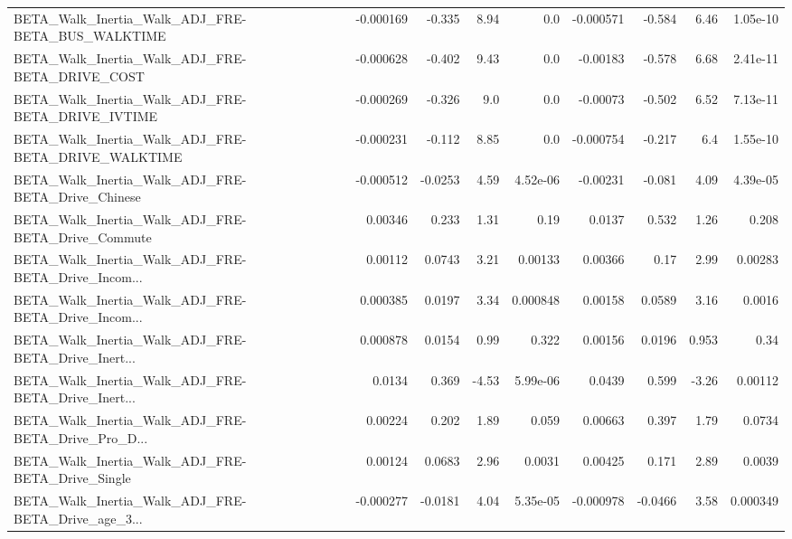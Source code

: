 \begin{tabular}{lrrrrrrrr}
BETA\_Walk\_Inertia\_Walk\_ADJ\_FRE-BETA\_BUS\_WALKTIME   &   -0.000169 &       -0.335 &     8.94 &      0.0 &  -0.000571 &      -0.584 &         6.46 &      1.05e-10 \\
BETA\_Walk\_Inertia\_Walk\_ADJ\_FRE-BETA\_DRIVE\_COST     &   -0.000628 &       -0.402 &     9.43 &      0.0 &   -0.00183 &      -0.578 &         6.68 &      2.41e-11 \\
BETA\_Walk\_Inertia\_Walk\_ADJ\_FRE-BETA\_DRIVE\_IVTIME   &   -0.000269 &       -0.326 &      9.0 &      0.0 &   -0.00073 &      -0.502 &         6.52 &      7.13e-11 \\
BETA\_Walk\_Inertia\_Walk\_ADJ\_FRE-BETA\_DRIVE\_WALKTIME &   -0.000231 &       -0.112 &     8.85 &      0.0 &  -0.000754 &      -0.217 &          6.4 &      1.55e-10 \\
BETA\_Walk\_Inertia\_Walk\_ADJ\_FRE-BETA\_Drive\_Chinese  &   -0.000512 &      -0.0253 &     4.59 & 4.52e-06 &   -0.00231 &      -0.081 &         4.09 &      4.39e-05 \\
BETA\_Walk\_Inertia\_Walk\_ADJ\_FRE-BETA\_Drive\_Commute  &     0.00346 &        0.233 &     1.31 &     0.19 &     0.0137 &       0.532 &         1.26 &         0.208 \\
BETA\_Walk\_Inertia\_Walk\_ADJ\_FRE-BETA\_Drive\_Incom... &     0.00112 &       0.0743 &     3.21 &  0.00133 &    0.00366 &        0.17 &         2.99 &       0.00283 \\
BETA\_Walk\_Inertia\_Walk\_ADJ\_FRE-BETA\_Drive\_Incom... &    0.000385 &       0.0197 &     3.34 & 0.000848 &    0.00158 &      0.0589 &         3.16 &        0.0016 \\
BETA\_Walk\_Inertia\_Walk\_ADJ\_FRE-BETA\_Drive\_Inert... &    0.000878 &       0.0154 &     0.99 &    0.322 &    0.00156 &      0.0196 &        0.953 &          0.34 \\
BETA\_Walk\_Inertia\_Walk\_ADJ\_FRE-BETA\_Drive\_Inert... &      0.0134 &        0.369 &    -4.53 & 5.99e-06 &     0.0439 &       0.599 &        -3.26 &       0.00112 \\
BETA\_Walk\_Inertia\_Walk\_ADJ\_FRE-BETA\_Drive\_Pro\_D... &     0.00224 &        0.202 &     1.89 &    0.059 &    0.00663 &       0.397 &         1.79 &        0.0734 \\
BETA\_Walk\_Inertia\_Walk\_ADJ\_FRE-BETA\_Drive\_Single   &     0.00124 &       0.0683 &     2.96 &   0.0031 &    0.00425 &       0.171 &         2.89 &        0.0039 \\
BETA\_Walk\_Inertia\_Walk\_ADJ\_FRE-BETA\_Drive\_age\_3... &   -0.000277 &      -0.0181 &     4.04 & 5.35e-05 &  -0.000978 &     -0.0466 &         3.58 &      0.000349 \\

\end{tabular}
